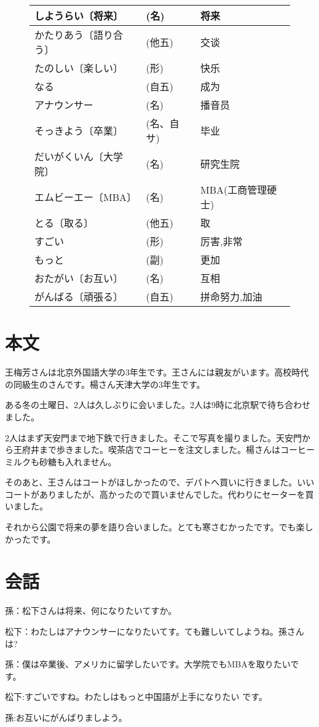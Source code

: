 \begin{figure}[htbp]
\begin{tabular}{l|l|l}
            しようらい〔将来〕& (名)  &  将来    \\\hline
            かたりあう〔語り合う〕& (他五)  & 交谈\\\hline   
            たのしい〔楽しい〕& (形) &   快乐\\\hline
        なる &(自五) & 成为    \\\hline
        アナウンサー & (名) & 播音员\\\hline
        そっきよう〔卒業〕& (名、自サ)&毕业\\\hline
        だいがくいん〔大学院〕& (名) &   研究生院   \\\hline
        エムビーエー〔MBA〕& (名) &   MBA(工商管理硬士)	\\\hline
        とる〔取る〕  & (他五)	&取\\\hline
        すごい	&(形)	&厉害,非常	\\\hline
        もっと	&(副)&	更加	\\\hline
        おたがい〔お互い〕	&(名)	&互相	\\\hline
        がんばる〔頑張る〕&	(自五)&	拼命努力,加油\\\hline
        \end{tabular}
    \end{figure}
    \section{本文}
    王梅芳さんは北京外国語大学の3年生です。王さんには親友がいます。高校時代の同級生のさんです。楊さん天津大学の3年生です。

    ある冬の土曜日、2人は久しぶりに会いました。2人は9時に北京駅で待ち合わせました。

    2人はまず天安門まで地下鉄で行きました。そこで写真を撮りました。天安門から王府井まで歩きました。喫茶店でコーヒーを注文しました。楊さんはコーヒーミルクも砂糖も入れません。

    そのあと、王さんはコートがほしかったので、デパトへ買いに行きました。いいコートがありましたが、高かったので買いませんでした。代わりにセーターを買いました。

    それから公園で将来の夢を語り合いました。とても寒さむかったです。でも楽しかったです。
    \section{会話}
    孫：松下さんは将来、何になりたいてすか。

    松下：わたしはアナウンサーになりたいてす。ても難しいてしようね。孫さんは?

    孫：僕は卒業後、アメリカに留学したいです。大学院でもMBAを取りたいです。

    松下:すごいですね。わたしはもっと中国語が上手になりたい
です。

    孫:お互いにがんばりましよう。

